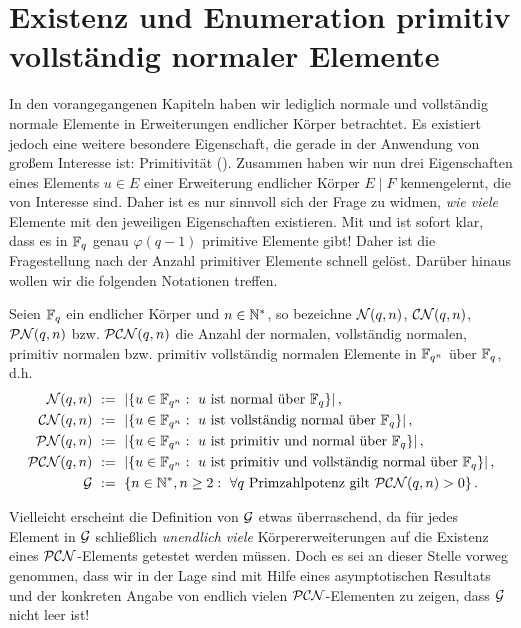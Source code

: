 \chapter{Existenz und Enumeration primitiv vollständig normaler Elemente}
\label{chap:existenz_und_enumeration}

In den vorangegangenen Kapiteln haben wir lediglich normale und vollständig
normale Elemente in Erweiterungen endlicher Körper betrachtet. Es existiert
jedoch eine weitere besondere Eigenschaft, die gerade in der Anwendung von
großem Interesse ist: Primitivität (). Zusammen haben wir
nun drei Eigenschaften eines Elements $u \in E$ einer Erweiterung endlicher
Körper $E\mid F$ kennengelernt, die von Interesse sind. Daher ist es nur
sinnvoll sich der Frage zu widmen, \emph{wie viele} Elemente mit den jeweiligen
Eigenschaften existieren. Mit  und 
 ist sofort klar, dass es in
$\F_q$ genau $\varphi(q-1)$ primitive Elemente gibt! Daher ist die
Fragestellung nach der Anzahl primitiver Elemente schnell gelöst. Darüber
hinaus wollen wir die folgenden Notationen treffen.

\begin{definition}
  \label{def:anzahlen}
  Seien $\F_q$ ein endlicher Körper und $n \in \N^\ast$, so bezeichne
  $\cal N(q,n)$, $\CN(q,n)$, $\PN(q,n)$ bzw. $\PCN(q,n)$ die Anzahl der 
  normalen, vollständig normalen, primitiv normalen bzw. primitiv vollständig
  normalen Elemente in $\F_{q^n}$ über $\F_q$, d.h.
  \begin{align*}
    \cal N(q,n) &\speq{:=} 
      |\{ u \in \F_{q^n}:\ u\text{ ist normal über }\F_q\}|\,, \\
    \CN(q,n) &\speq{:=} 
      |\{ u \in \F_{q^n}:\ u\text{ ist vollständig normal über }\F_q\}|\,, \\
    \PN(q,n) &\speq{:=} 
      |\{ u \in \F_{q^n}:\ u\text{ ist primitiv und normal über }\F_q\}|\,, \\
    \PCN(q,n) &\speq{:=} 
      |\{ u \in \F_{q^n}:\ u\text{ ist primitiv und vollständig 
      normal über }\F_q\}|\,, \\
    \G &\speq{:=} 
      \{ n\in \N^\ast, n\geq 2:\ 
      \forall q\text{ Primzahlpotenz gilt } \PCN(q,n) > 0 \}\,.
  \end{align*}
\end{definition}

Vielleicht erscheint die Definition von $\G$ etwas überraschend, da für jedes
Element in $\G$ schließlich \emph{unendlich viele} Körpererweiterungen auf die
Existenz eines $\PCN$-Elements getestet werden müssen. Doch es sei an dieser
Stelle vorweg genommen, dass wir in der Lage sind mit Hilfe eines
asymptotischen Resultats und der konkreten Angabe von endlich vielen
$\PCN$-Elementen zu zeigen, dass $\G$ nicht leer ist!


